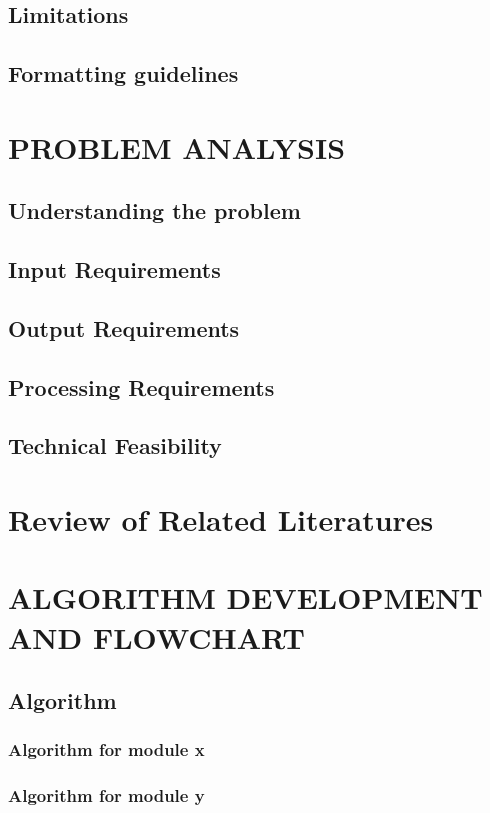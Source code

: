 \documentclass[12pt, final]{report}
\begin{document}
\section{Limitations}
\section{Formatting guidelines}


\chapter{PROBLEM ANALYSIS}
\blindtext
\section{Understanding the problem}
	\blindtext
\section{Input Requirements}
	\blindtext
\section{Output Requirements}
	\blindtext
\section{Processing Requirements}
\section{Technical Feasibility}


\chapter{Review of Related Literatures}


\chapter{ALGORITHM DEVELOPMENT AND FLOWCHART}
\section{Algorithm}
	\subsection{Algorithm for module x}
	\subsection{Algorithm for module y}
\end{document}
